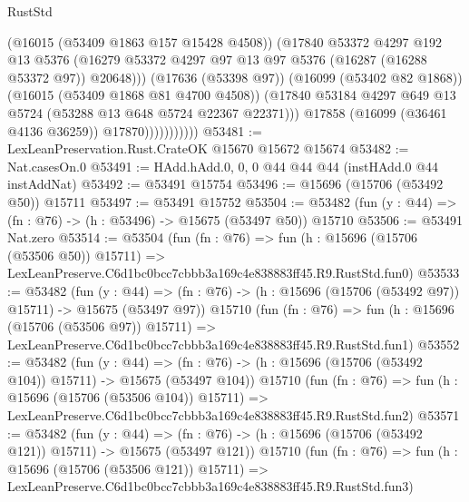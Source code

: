 \begin{lexlean}{RustStd}
\begin{coremodule}
                              (@16015 (@53409 @1863 @157 @15428 @4508))
                              (@17840
                                @53372
                                @4297
                                @192
                                @13
                                @5376
                                (@16279
                                  @53372
                                  @4297
                                  @97
                                  @13
                                  @97
                                  @5376
                                  (@16287 (@16288 @53372 @97))
                                  @20648)))
                            (@17636 (@53398 @97))
                            (@16099 (@53402 @82 @1868))
                            (@16015 (@53409 @1868 @81 @4700 @4508))
                            (@17840
                              @53184
                              @4297
                              @649
                              @13
                              @5724
                              (@53288 @13 @648 @5724 @22367 @22371)))
                          @17858
                          (@16099 (@36461 @4136 @36259))
                          @17870)))))))))))
@53481 := LexLeanPreservation.Rust.CrateOK @15670 @15672 @15674
@53482 := Nat.casesOn.{0}
@53491 := HAdd.hAdd.{0, 0, 0} @44 @44 @44 (instHAdd.{0} @44 instAddNat)
@53492 := @53491 @15754
@53496 := @15696 (@15706 (@53492 @50)) @15711
@53497 := @53491 @15752
@53504 := @53482 (fun (y : @44) => (fn : @76) -> (h : @53496) -> @15675 (@53497 @50)) @15710
@53506 := @53491 Nat.zero
@53514 := @53504
    (fun (fn : @76) =>
    fun (h : @15696 (@15706 (@53506 @50)) @15711) =>
    LexLeanPreserve.C6d1bc0bcc7cbbb3a169c4e838883ff45.R9.RustStd.fun0)
@53533 := @53482
    (fun (y : @44) =>
    (fn : @76) -> (h : @15696 (@15706 (@53492 @97)) @15711) -> @15675 (@53497 @97))
    @15710
    (fun (fn : @76) =>
    fun (h : @15696 (@15706 (@53506 @97)) @15711) =>
    LexLeanPreserve.C6d1bc0bcc7cbbb3a169c4e838883ff45.R9.RustStd.fun1)
@53552 := @53482
    (fun (y : @44) =>
    (fn : @76) -> (h : @15696 (@15706 (@53492 @104)) @15711) -> @15675 (@53497 @104))
    @15710
    (fun (fn : @76) =>
    fun (h : @15696 (@15706 (@53506 @104)) @15711) =>
    LexLeanPreserve.C6d1bc0bcc7cbbb3a169c4e838883ff45.R9.RustStd.fun2)
@53571 := @53482
    (fun (y : @44) =>
    (fn : @76) -> (h : @15696 (@15706 (@53492 @121)) @15711) -> @15675 (@53497 @121))
    @15710
    (fun (fn : @76) =>
    fun (h : @15696 (@15706 (@53506 @121)) @15711) =>
    LexLeanPreserve.C6d1bc0bcc7cbbb3a169c4e838883ff45.R9.RustStd.fun3)

\end{coremodule}
\end{lexlean}
